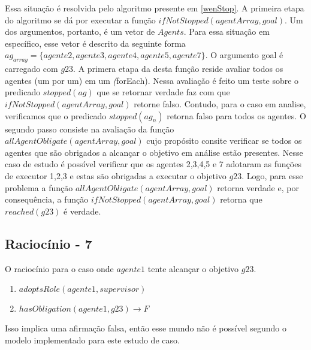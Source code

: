 Essa situação é resolvida pelo algoritmo presente em \ref{wenStop}. A primeira etapa do algoritmo se dá por executar a função $ifNotStopped(agentArray,goal)$. Um dos argumentos, portanto, é um vetor de $Agents$. Para essa situação em específico, esse vetor é descrito da seguinte forma $ag_{array} = \{ agente2,agente3,agente4,agente5,agente7 \}$. O argumento goal é carregado com $g23$. A primera etapa da desta função reside avaliar todos os agentes (um por um) em um \textit(forEach). Nessa avaliação é feito um teste sobre o predicado $stopped(ag)$ que se retornar verdade faz com que $ifNotStopped(agentArray,goal)$ retorne falso. Contudo, para o caso em analise, verificamos que o predicado $stopped(ag_n)$ retorna falso para todos os agentes. O segundo passo consiste na avaliação da função $allAgentObligate(agentArray,goal)$ cujo propósito consite verificar se todos os agentes que são obrigados a alcançar o objetivo em análise estão presentes. Nesse caso de estudo é possível verificar que os agentes 2,3,4,5 e 7 adotaram as funções de executor 1,2,3 e estas são obrigadas a executar o objetivo $g23$. Logo, para esse problema a função $allAgentObligate(agentArray,goal)$ retorna verdade e, por consequência, a função $ifNotStopped(agentArray,goal)$ retorna que $reached(g23)$ é verdade.  


\subsection{Raciocínio - 7}
\label{raciocinio7}
O raciocínio para o caso onde $agente1$ tente alcançar o objetivo $g23$.  

\begin{enumerate}
	\item $adoptsRole(agente1,supervisor)$
	\item $hasObligation(agente1,g23) \to F$										
\end{enumerate}

Isso implica uma afirmação falsa, então esse mundo não é possível segundo o modelo implementado para este estudo de caso.